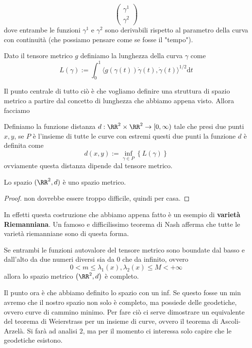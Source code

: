 \documentclass[11pt]{scrartcl}
\newcommand{\dif}{\text{d}}
\begin{document}
	 $$\begin{pmatrix}
	 	\gamma^1 \\
	 	\gamma^2
	 \end{pmatrix}$$
	 dove entrambe le funzioni $\gamma^1$ e $\gamma^2$ sono derivabili rispetto al parametro della curva con continuità (che possiamo pensare come se fosse il "tempo").
	 \begin{definition}
	 	Dato il tensore metrico $g$ definiamo la lunghezza della curva $\gamma$ come
	 	$$L(\gamma):=\int_0^1\langle g(\gamma(t))\dot{\gamma}(t),\dot{\gamma}(t)\rangle^{1/2}\dif t$$
	 \end{definition}
	 Il punto centrale di tutto ciò è che vogliamo definire una struttura di spazio metrico a partire dal concetto di lunghezza che abbiamo appena visto. Allora facciamo
	 \begin{definition}
	 	Definiamo la funzione distanza $d:\RR^2\times \RR^2\to [0,\infty)$ tale che presi due punti $x,y$, se $P$ è l'insieme di tutte le curve con estremi questi due punti la funzione $d$ è definita come
	 	$$d(x,y):=\inf_{\gamma \in P}\left\{L(\gamma)\right\}$$
	 	ovviamente questa distanza dipende dal tensore metrico.
	 \end{definition}
	 \begin{theorem}
	 	Lo spazio $(\RR^2,d)$ è uno spazio metrico.
	 \end{theorem}
	 \begin{proof}
	 	non dovrebbe essere troppo difficile, quindi per casa.
	 \end{proof}
	 In effetti questa costruzione che abbiamo appena fatto è un esempio di \textbf{varietà Riemanniana}. Un famoso e difficilissimo teorema di Nash afferma che tutte le varietà riemanniane sono di questa forma. 
	 \begin{theorem}
	 	Se entrambi le funzioni autovalore del tensore metrico sono boundate dal basso e dall'alto da due numeri diversi sia da $0$ che da infinito, ovvero
	 	$$0<m\le \lambda_1(x),\lambda_2(x)\le M < +\infty$$
	 	allora lo spazio metrico $\left(\RR^2,d\right)$ è completo.
	 \end{theorem}
	 Il punto ora è che abbiamo definito lo spazio con un inf. Se questo fosse un min avremo che il nostro spazio non solo è completo, ma possiede delle geodetiche, ovvero curve di cammino minimo. Per fare ciò ci serve dimostrare un equivalente del teorema di Weierstrass per un insieme di curve, ovvero il teorema di Ascoli-Arzelà. Si farà ad analisi $2$, ma per il momento ci interessa solo capire che le geodetiche esistono.
\end{document}
